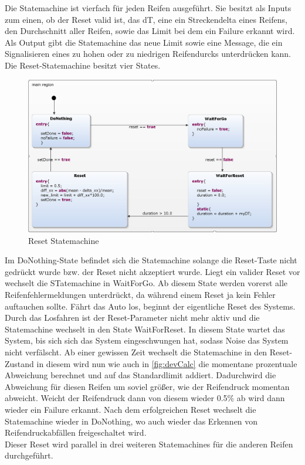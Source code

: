 Die Statemachine ist vierfach für jeden Reifen ausgeführt. Sie besitzt als Inputs zum einen, ob der Reset valid ist, das dT, eine ein Streckendelta eines Reifens, den Durchschnitt aller Reifen, sowie das Limit bei dem ein Failure erkannt wird. Als Output gibt die Statemachine das neue Limit sowie eine Message, die ein Signalisieren eines zu hohen oder zu niedrigen Reifendurcks unterdrücken kann.\\
Die Reset-Statemachine besitzt vier States.
\begin{figure}[H]
	\centering
	\includegraphics[width=1\linewidth]{../Graphiken/ResetStateMachine.png}
	\caption{Reset Statemachine}
	\label{fig:ResetStateMachine}
\end{figure}
Im DoNothing-State befindet sich die Statemachine solange die Reset-Taste nicht gedrückt wurde bzw. der Reset nicht akzeptiert wurde. Liegt ein valider Reset vor wechselt die STatemachine in WaitForGo. Ab diesem State werden vorerst alle Reifenfehlermeldungen unterdrückt, da während einem Reset ja kein Fehler auftauchen sollte. Fährt das Auto los, beginnt der eigentliche Reset des Systems. Durch das Losfahren ist der Reset-Parameter nicht mehr aktiv und die Statemachine wechselt in den State WaitForReset. In diesem State wartet das System, bis sich sich das System eingeschwungen hat, sodass Noise das System nicht verfälscht. Ab einer gewissen Zeit wechselt die Statemachine in den Reset-Zustand in diesem wird nun wie auch in \autoref{fig:devCalc} die momentane prozentuale Abweichung berechnet und auf das Standardlimit addiert. Dadurchwird die Abweichung für diesen Reifen um soviel größer, wie der Reifendruck momentan abweicht. Weicht der Reifendruck dann von diesem wieder 0.5\% ab wird dann wieder ein Failure erkannt. Nach dem erfolgreichen Reset wechselt die Statemachine wieder in DoNothing, wo auch wieder das Erkennen von Reifendruckabfällen freigeschaltet wird.\\
Dieser Reset wird parallel in drei weiteren Statemachines für die anderen Reifen durchgeführt.